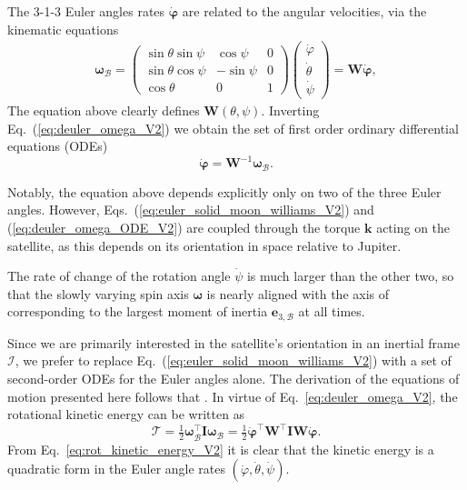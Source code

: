 \documentclass[pdflatex,sn-mathphys-num]{sn-jnl}%
\theoremstyle{thmstyleone}%
\theoremstyle{thmstyletwo}%
\theoremstyle{thmstylethree}%
\renewcommand{\vec}[1]{\boldsymbol{#1}}
\begin{document}
The 3-1-3 Euler angles rates $\dot{\vec{\varphi}}$ are related to the angular velocities, via the kinematic equations 
 \begin{align} \label{eq:deuler_omega_V2}
	\vec{\omega}_{\mathcal{B}} = 
	\begin{pmatrix}
			\sin\theta \sin\psi  & \cos\psi & 0 \\
			\sin\theta \cos\psi &-\sin\psi & 0 \\
			\cos\theta & 0 &1 
	\end{pmatrix}
	\begin{pmatrix}
		\dot{\varphi} \\
		\dot{\theta} \\
		\dot{\psi}
	\end{pmatrix}
	= \vec{W}\dot{\vec{\varphi}},
\end{align}
%
The equation above clearly defines $\vec{W}(\theta,\psi)$.
Inverting Eq.~(\ref{eq:deuler_omega_V2}) we obtain the set of
first order ordinary differential equations (ODEs)
\begin{equation}\label{eq:deuler_omega_ODE_V2}
	\dot{\vec{\varphi}} = \vec{W}^{-1}\vec{\omega}_{\mathcal{B}}.
\end{equation} 


Notably, the equation above depends explicitly only on two of the three Euler angles.
However, Eqs.~(\ref{eq:euler_solid_moon_williams_V2}) and (\ref{eq:deuler_omega_ODE_V2}) are coupled through the torque $\vec{k}$ acting on the satellite, as this depends on its orientation in space relative to Jupiter.


The rate of change of the rotation angle $\dot{\psi}$ is much larger than the other two, so that the slowly varying spin axis $\vec{\omega}$ is nearly aligned with the axis of corresponding to the largest moment of inertia $\vec{e}_{3,\mathcal{B}}$ at all times. 


Since we are primarily interested in the satellite's orientation in an inertial frame  $\mathcal{I}$, we prefer to replace Eq.~(\ref{eq:euler_solid_moon_williams_V2}) with a set of second-order ODEs for the Euler angles alone. The derivation of the equations of motion presented here follows that \citet{Broucke1990doi:10.2514/3.20591}.
In virtue of Eq.~\eqref{eq:deuler_omega_V2}, the rotational kinetic energy can be written as
\begin{equation}\label{eq:rot_kinetic_energy_V2}
	\mathcal{T}  = 
	\tfrac{1}{2} \vec{\omega}_{\mathcal{B}}^\top \vec{I} \vec{\omega}_{\mathcal{B}} 
	= \tfrac{1}{2} \dot{\vec{\varphi}}^\top\vec{W}^\top \vec{I} \vec{W}\dot{\vec{\varphi}}.
\end{equation}
From Eq.~\eqref{eq:rot_kinetic_energy_V2} it is clear that the kinetic energy is a quadratic form in the Euler angle rates
${(\dot{\varphi},\dot{\theta},\dot{\psi})}$.
\end{document}
